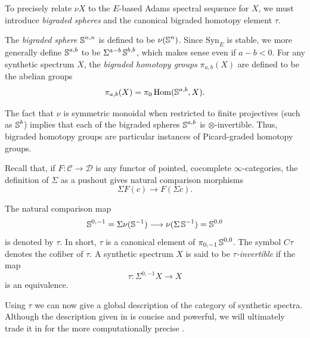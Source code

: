 To precisely relate $\nu X$ to the $E$-based Adams spectral sequence for $X$, we must introduce \emph{bigraded spheres} and the canonical bigraded homotopy element $\tau$. 

\begin{dfn}
The \emph{bigraded sphere} $\operatorname{\mathbb{S}}^{n,n}$ is defined to be $\nu(\operatorname{\mathbb{S}}^{n})$.  Since $\mathrm{Syn}_E$ is stable, we more generally define
$\operatorname{\mathbb{S}}^{a,b}$
to be $\Sigma^{a-b} \operatorname{\mathbb{S}}^{b,b}$, which makes sense even if $a-b<0$. For any synthetic spectrum $X$, the \emph{bigraded homotopy groups} $\pi_{a,b}(X)$ are defined to be the abelian groups
$$ \pi_{a,b}(X) = \pi_0 \operatorname{\mathrm{Hom}}(\operatorname{\mathbb{S}}^{a,b},X). $$
\end{dfn}


\begin{rmk}
  The fact that $\nu$ is symmetric monoidal when restricted to finite projectives (such as $\operatorname{\mathbb{S}}^b$) implies that each of the bigraded spheres $\operatorname{\mathbb{S}}^{a,b}$ is $\otimes$-invertible. Thus, bigraded homotopy groups are particular instances of Picard-graded homotopy groups.
\end{rmk}

\begin{rmk} \label{rmk:colimit-compare}
Recall that, if $F:\mathcal{C} \to \mathcal{D}$ is any functor of pointed, cocomplete $\infty$-categories, the definition of $\Sigma$ as a pushout gives natural comparison morphisms
$$\Sigma F(c) \to F(\Sigma c).$$
\end{rmk}

\begin{dfn}
The natural comparison map 
$$\operatorname{\mathbb{S}}^{0,-1}=\Sigma \nu(\operatorname{\mathbb{S}}^{-1}) \longrightarrow \nu(\Sigma \operatorname{\mathbb{S}}^{-1})=\operatorname{\mathbb{S}}^{0,0}$$
is denoted by $\tau$.  In short, $\tau$ is a canonical element of $\pi_{0,-1} \operatorname{\mathbb{S}}^{0,0}$.   The symbol $C\tau$ denotes the cofiber of $\tau$.  A synthetic spectrum $X$ is said to be \emph{$\tau$-invertible} if the map $$\tau:\Sigma^{0,-1} X \to X$$ is an equivalence.  
\end{dfn}

Using $\tau$ we can now give a global description of the category of synthetic spectra.
Although the description given in  is concise and powerful,
we will ultimately trade it in for the more computationally precise .


